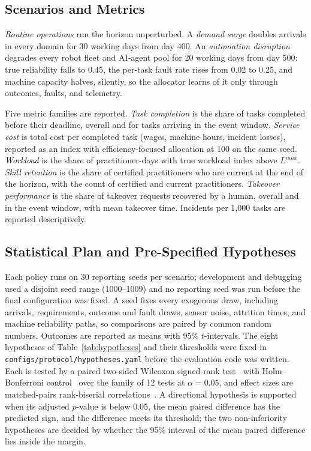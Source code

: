 \documentclass[utf8]{FrontiersinHarvard}
\begin{document}
	\subsection{Scenarios and Metrics}
	\label{sec:scenarios}

	\textit{Routine operations} run the horizon unperturbed. A \textit{demand surge} doubles arrivals in every domain for 30 working days from day 400. An \textit{automation disruption} degrades every robot fleet and AI-agent pool for 20 working days from day 500: true reliability falls to 0.45, the per-task fault rate rises from 0.02 to 0.25, and machine capacity halves, silently, so the allocator learns of it only through outcomes, faults, and telemetry.

	Five metric families are reported. \textit{Task completion} is the share of tasks completed before their deadline, overall and for tasks arriving in the event window. \textit{Service cost} is total cost per completed task (wages, machine hours, incident losses), reported as an index with efficiency-focused allocation at 100 on the same seed. \textit{Workload} is the share of practitioner-days with true workload index above $L^{max}$. \textit{Skill retention} is the share of certified practitioners who are current at the end of the horizon, with the count of certified and current practitioners. \textit{Takeover performance} is the share of takeover requests recovered by a human, overall and in the event window, with mean takeover time. Incidents per 1,000 tasks are reported descriptively.

	\subsection{Statistical Plan and Pre-Specified Hypotheses}
	\label{sec:stats}

	Each policy runs on 30 reporting seeds per scenario; development and debugging used a disjoint seed range (1000--1009) and no reporting seed was run before the final configuration was fixed. A seed fixes every exogenous draw, including arrivals, requirements, outcome and fault draws, sensor noise, attrition times, and machine reliability paths, so comparisons are paired by common random numbers. Outcomes are reported as means with 95\% $t$-intervals. The eight hypotheses of Table~\ref{tab:hypotheses} and their thresholds were fixed in \texttt{configs/protocol/hypotheses.yaml} before the evaluation code was written. Each is tested by a paired two-sided Wilcoxon signed-rank test~\citep{Wilcoxon1945} with Holm--Bonferroni control~\citep{Holm1979} over the family of 12 tests at $\alpha=0.05$, and effect sizes are matched-pairs rank-biserial correlations~\citep{Kerby2014}. A directional hypothesis is supported when its adjusted $p$-value is below 0.05, the mean paired difference has the predicted sign, and the difference meets its threshold; the two non-inferiority hypotheses are decided by whether the 95\% interval of the mean paired difference lies inside the margin.
\end{document}
